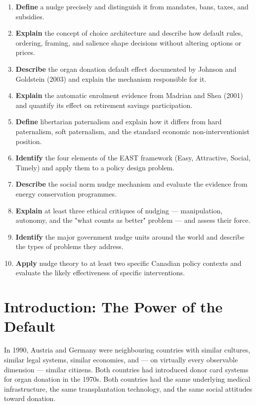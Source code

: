 \documentclass[12pt, letterpaper]{article}
\begin{document}
\begin{enumerate}
\item \textbf{Define} a nudge precisely and distinguish it from mandates, bans, taxes, and subsidies.
\item \textbf{Explain} the concept of choice architecture and describe how default rules, ordering, framing, and salience shape decisions without altering options or prices.
\item \textbf{Describe} the organ donation default effect documented by Johnson and Goldstein (2003) and explain the mechanism responsible for it.
\item \textbf{Explain} the automatic enrolment evidence from Madrian and Shea (2001) and quantify its effect on retirement savings participation.
\item \textbf{Define} libertarian paternalism and explain how it differs from hard paternalism, soft paternalism, and the standard economic non-interventionist position.
\item \textbf{Identify} the four elements of the EAST framework (Easy, Attractive, Social, Timely) and apply them to a policy design problem.
\item \textbf{Describe} the social norm nudge mechanism and evaluate the evidence from energy conservation programmes.
\item \textbf{Explain} at least three ethical critiques of nudging --- manipulation, autonomy, and the "what counts as better" problem --- and assess their force.
\item \textbf{Identify} the major government nudge units around the world and describe the types of problems they address.
\item \textbf{Apply} nudge theory to at least two specific Canadian policy contexts and evaluate the likely effectiveness of specific interventions.
\end{enumerate}

\medskip


\section*{Introduction: The Power of the Default}


In 1990, Austria and Germany were neighbouring countries with similar cultures, similar legal systems, similar economies, and --- on virtually every observable dimension --- similar citizens. Both countries had introduced donor card systems for organ donation in the 1970s. Both countries had the same underlying medical infrastructure, the same transplantation technology, and the same social attitudes toward donation.
\end{document}
